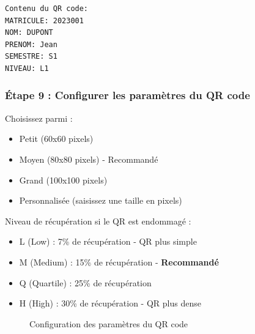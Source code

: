 \begin{verbatim}
Contenu du QR code:
MATRICULE: 2023001
NOM: DUPONT
PRENOM: Jean
SEMESTRE: S1
NIVEAU: L1
\end{verbatim}

\subsubsection{Étape 9 : Configurer les paramètres du QR code}

\begin{description}[leftmargin=3.5cm]
    \item[Taille] Choisissez parmi :
    \begin{itemize}
        \item Petit (60x60 pixels)
        \item Moyen (80x80 pixels) - Recommandé
        \item Grand (100x100 pixels)
        \item Personnalisée (saisissez une taille en pixels)
    \end{itemize}

    \item[Correction d'erreur] Niveau de récupération si le QR est endommagé :
    \begin{itemize}
        \item L (Low) : 7\% de récupération - QR plus simple
        \item M (Medium) : 15\% de récupération - \textbf{Recommandé}
        \item Q (Quartile) : 25\% de récupération
        \item H (High) : 30\% de récupération - QR plus dense
    \end{itemize}
\end{description}

\begin{figure}[h]
    \centering
    \caption{Configuration des paramètres du QR code}
\end{figure}

